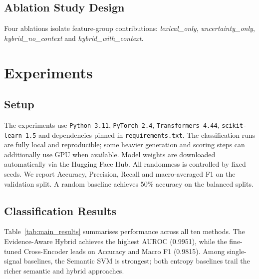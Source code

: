 \documentclass[conference]{IEEEtran}
\begin{document}
\subsection{Ablation Study Design}

Four ablations isolate feature-group contributions: \textit{lexical\_only}, \textit{uncertainty\_only}, \textit{hybrid\_no\_context} and \textit{hybrid\_with\_context}.

\section{Experiments}
\label{sec:experiments}

\subsection{Setup}

The experiments use \texttt{Python~3.11}, \texttt{PyTorch~2.4},
\texttt{Transformers~4.44}, \texttt{scikit-learn~1.5}
\cite{pedregosa2011sklearn} and dependencies pinned in
\texttt{requirements.txt}. The classification runs are fully local and
reproducible; some heavier generation and scoring steps can additionally use
GPU when available. Model weights are downloaded automatically via the Hugging
Face Hub. All randomness is controlled by fixed seeds. We report Accuracy,
Precision, Recall and macro-averaged F1 on the validation split. A random
baseline achieves 50\% accuracy on the balanced splits.

\subsection{Classification Results}

Table~\ref{tab:main_results} summarises performance across all ten methods. The Evidence-Aware Hybrid achieves the highest AUROC (0.9951), while the fine-tuned Cross-Encoder leads on Accuracy and Macro F1 (0.9815). Among single-signal baselines, the Semantic SVM is strongest; both entropy baselines trail the richer semantic and hybrid approaches.
\end{document}
